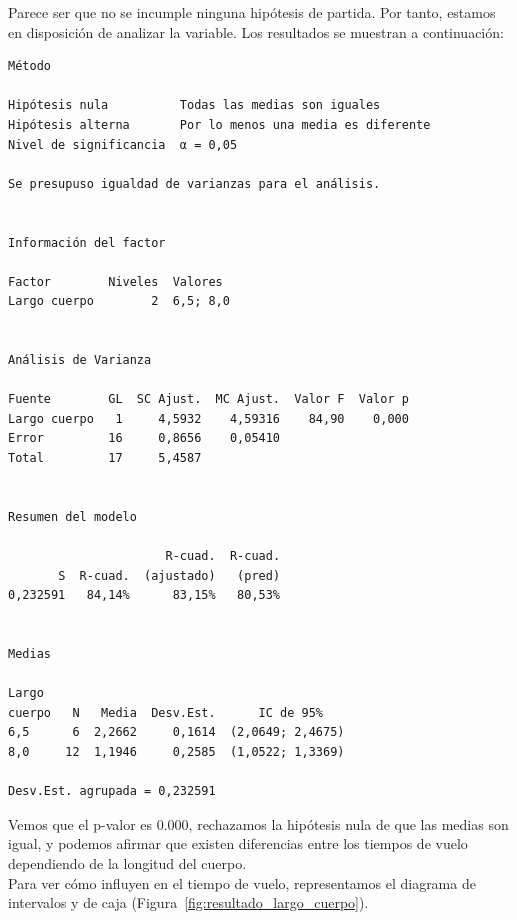 \documentclass[12pt,a4paper,twoside,openright,titlepage,final]{article}
\begin{document}
Parece ser que no se incumple ninguna hipótesis de partida. Por tanto, estamos en disposición de analizar la variable. Los resultados se muestran a continuación:

\begin{verbatim}
Método

Hipótesis nula          Todas las medias son iguales
Hipótesis alterna       Por lo menos una media es diferente
Nivel de significancia  α = 0,05

Se presupuso igualdad de varianzas para el análisis.


Información del factor

Factor        Niveles  Valores
Largo cuerpo        2  6,5; 8,0


Análisis de Varianza

Fuente        GL  SC Ajust.  MC Ajust.  Valor F  Valor p
Largo cuerpo   1     4,5932    4,59316    84,90    0,000
Error         16     0,8656    0,05410
Total         17     5,4587


Resumen del modelo

                      R-cuad.  R-cuad.
       S  R-cuad.  (ajustado)   (pred)
0,232591   84,14%      83,15%   80,53%


Medias

Largo
cuerpo   N   Media  Desv.Est.      IC de 95%
6,5      6  2,2662     0,1614  (2,0649; 2,4675)
8,0     12  1,1946     0,2585  (1,0522; 1,3369)

Desv.Est. agrupada = 0,232591
\end{verbatim} 

Vemos que el p-valor es 0.000, rechazamos la hipótesis nula de que las medias son igual, y podemos afirmar que existen diferencias entre los tiempos de vuelo dependiendo de la longitud del cuerpo.\\

Para ver cómo influyen en el tiempo de vuelo, representamos el diagrama de intervalos y de caja (Figura~\ref{fig:resultado_largo_cuerpo}).\\
\end{document}
